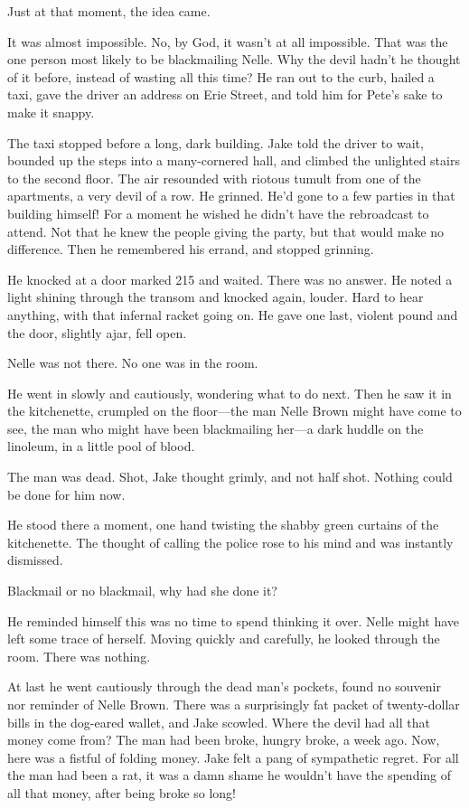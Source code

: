 \documentclass{novel}
\begin{document}
Just at that moment, the idea came.

It was almost impossible. No, by God, it wasn't at all impossible. That was the one person most likely to be blackmailing Nelle. Why the devil hadn't he thought of it before, instead of wasting all this time? He ran out to the curb, hailed a taxi, gave the driver an address on Erie Street, and told him for Pete's sake to make it snappy.

The taxi stopped before a long, dark building. Jake told the driver to wait, bounded up the steps into a many-cornered hall, and climbed the unlighted stairs to the second floor. The air resounded with riotous tumult from one of the apartments, a very devil of a row. He grinned. He'd gone to a few parties in that building himself! For a moment he wished he didn't have the rebroadcast to attend. Not that he knew the people giving the party, but that would make no difference. Then he remembered his errand, and stopped grinning.

He knocked at a door marked 215 and waited. There was no answer. He noted a light shining through the transom and knocked again, louder. Hard to hear anything, with that infernal racket going on. He gave one last, violent pound and the door, slightly ajar, fell open.

Nelle was not there. No one was in the room.

He went in slowly and cautiously, wondering what to do next. Then he saw it in the kitchenette, crumpled on the floor—the man Nelle Brown might have come to see, the man who might have been blackmailing her—a dark huddle on the linoleum, in a little pool of blood.

The man was dead. Shot, Jake thought grimly, and not half shot. Nothing could be done for him now.

He stood there a moment, one hand twisting the shabby green curtains of the kitchenette. The thought of calling the police rose to his mind and was instantly dismissed.

Blackmail or no blackmail, why had she done it?

He reminded himself this was no time to spend thinking it over. Nelle might have left some trace of herself. Moving quickly and carefully, he looked through the room. There was nothing.

At last he went cautiously through the dead man's pockets, found no souvenir nor reminder of Nelle Brown. There was a surprisingly fat packet of twenty-dollar bills in the dog-eared wallet, and Jake scowled. Where the devil had all that money come from? The man had been broke, hungry broke, a week ago. Now, here was a fistful of folding money. Jake felt a pang of sympathetic regret. For all the man had been a rat, it was a damn shame he wouldn't have the spending of all that money, after being broke so long!
\end{document}
